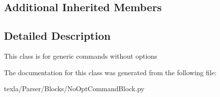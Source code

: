 \subsection*{Additional Inherited Members}


\subsection{Detailed Description}
\begin{DoxyVerb}This class is for generic commands without options\end{DoxyVerb}
 

The documentation for this class was generated from the following file\+:\begin{DoxyCompactItemize}
\item 
texla/\+Parser/\+Blocks/No\+Opt\+Command\+Block.\+py\end{DoxyCompactItemize}

